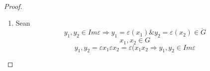 	\begin{proof}
    \begin{enumerate}[i]
      \item Sean 
      \begin{equation}
        y_{1},y_{2}\in Im\varepsilon \Rightarrow y_{1}=\varepsilon (x_{1}) \& y_{2}=\varepsilon (x_{2})\in \acute{G} \nonumber
      \end{equation}
      \begin{equation}
      x_{1},x_{2}\in G \nonumber
      \end{equation}
      \begin{equation}
         y_{1},y_{2}=\varepsilon x_{1}\varepsilon x_{2}=\varepsilon (x_{1}x_{2} \Rightarrow y_{1},y_{2}\in Im\varepsilon  \nonumber
      \end{equation}
    \end{enumerate}
	\end{proof}
	
